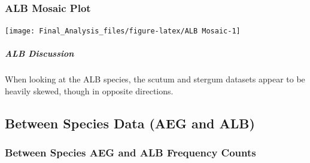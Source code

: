 \subsubsection{ALB Mosaic Plot}\label{alb-mosaic-plot}

\begin{Shaded}
\begin{Highlighting}[]
 \NormalTok{)}
\end{Highlighting}
\end{Shaded}

\begin{center}\texttt{[image: Final\_Analysis\_files/figure-latex/ALB Mosaic-1]} \end{center}

\subparagraph{ALB Discussion}\label{alb-discussion}

When looking at the ALB species, the scutum and stergum datasets appear
to be heavily skewed, though in opposite directions.

\subsection{Between Species Data (AEG and
ALB)}\label{between-species-data-aeg-and-alb}

\subsubsection{Between Species AEG and ALB Frequency
Counts}\label{between-species-aeg-and-alb-frequency-counts}

\begin{Shaded}
\begin{Highlighting}[]
\NormalTok{(} \NormalTok{, } \NormalTok{)}
\end{Highlighting}
\end{Shaded}

